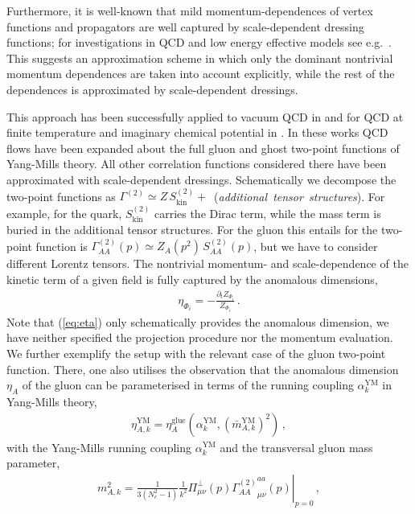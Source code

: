\documentclass[%
reprint,
superscriptaddress,
showpacs,preprintnumbers,
 amsmath,amssymb,
 aps,
prd,
]{revtex4-1}
\def\eq#1{(\ref{#1})}
\begin{document}
Furthermore, it is well-known that mild momentum-dependences of vertex
functions and propagators are well captured by scale-dependent
dressing functions; for investigations in QCD and low energy effective
models see e.g.\ \cite{ Helmboldt:2014iya, Pawlowski:2014zaa,
  Braun:2014ata, Rennecke:2015, Rennecke:2016tkm}. This suggests an
approximation scheme in which only the dominant nontrivial momentum
dependences are taken into account explicitly, while the rest of the
dependences is approximated by scale-dependent dressings.

This approach has been successfully applied to vacuum QCD in
\cite{Braun:2014ata, Rennecke:2015eba, Rennecke:2015} and for QCD at
finite temperature and imaginary chemical potential in
\cite{Braun:2009gm}. In these works QCD flows have been expanded about
the full gluon and ghost two-point functions of Yang-Mills theory. All
other correlation functions considered there have been approximated
with scale-dependent dressings. Schematically we decompose the
two-point functions as
\mbox{$\Gamma^{(2)} \simeq Z \, S^{(2)}_{\textrm{kin}}+$
  (\textit{additional tensor structures})}. For example, for the
quark, $S^{(2)}_{\textrm{kin}}$ carries the Dirac term, while the mass
term is buried in the additional tensor structures. For the gluon this
entails for the two-point function is
$\Gamma^{(2)}_{A A}(p) \simeq Z_A(p^2) \, S^{(2)}_{AA}(p)$, but we
have to consider different Lorentz tensors. The nontrivial momentum-
and scale-dependence of the kinetic term of a given field is fully
captured by the anomalous dimensions,
%
\begin{align}\label{eq:eta}
  \eta_{\Phi_i}= -\frac{\partial_t Z_{\Phi_i}}{Z_{\Phi_i}} \,.
\end{align}
%
Note that \eq{eq:eta} only schematically provides the anomalous dimension, we
have neither specified the projection procedure nor the momentum
evaluation. We further exemplify the setup with the relevant case of
the gluon two-point function. There, one also utilises the observation
that the anomalous dimension $\eta_A$ of the gluon can be
parameterised in terms of the running coupling
$\alpha^{\textrm{YM}}_k$ in Yang-Mills theory,
%
\begin{align}\label{eq:eta(alpha)}
  \eta_{A,k}^\textrm{YM}= \eta_A^{\textrm{glue}}\left(\alpha^{\textrm{YM}}_k,
  (\bar m^{\textrm{YM}}_{A,k})^2\right)\,,
\end{align}
%
with the Yang-Mills running coupling $\alpha^{\textrm{YM}}_k$ and the
transversal gluon mass parameter,
%
\begin{align}\label{eq:mA}
m_{A,k}^2= \left. \frac{1}{3( N_c^2 -1)}\frac{1}{k^2}
  \Pi_{\mu\nu}^{\perp}(p){\Gamma^{(2)}_{AA}}^{aa}_{\mu\nu}(p) \right|_{p=0}\,,
\end{align}
\end{document}
